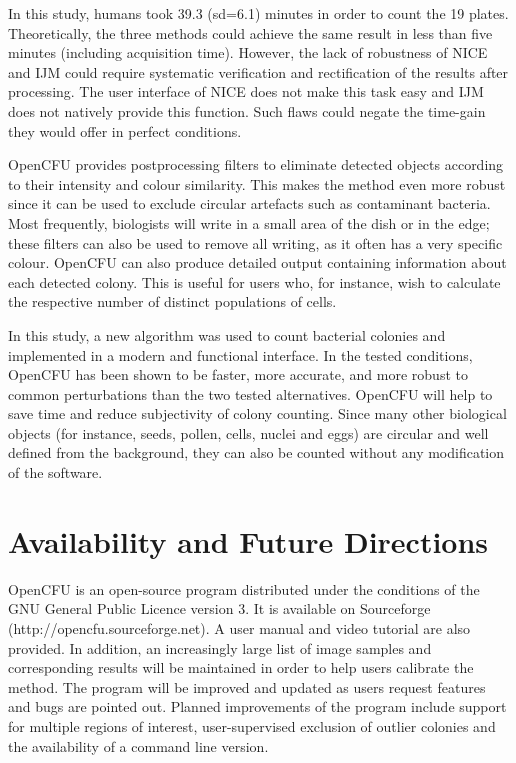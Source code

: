 \documentclass[10pt]{article}
\newcommand{\website}{http://opencfu.sourceforge.net}
\newcommand{\humantime}{39.3 (sd=6.1)}
\newcommand{\IJM}{IJM}
\begin{document}
In this study, humans took \humantime{} minutes in order to count the 19 plates.
Theoretically, the three methods could achieve the same result in less
than five minutes (including acquisition time). However, the lack of robustness of
NICE and \IJM{} could require systematic verification and
rectification of the results after processing. The user interface of NICE does not make this task easy and \IJM{} does not natively
provide this function. Such flaws could negate the time-gain they
would offer in perfect conditions.


OpenCFU provides postprocessing filters to eliminate detected
objects according to their intensity and colour similarity. This makes the method
even more robust since it can be used to exclude circular artefacts such as
contaminant bacteria. Most frequently, biologists will write in a small area of
the dish or in the edge; these filters can also be used to remove all writing, as it often has a very specific colour.
OpenCFU can also produce detailed output containing information about each detected
colony. This is useful for users who, for instance, wish to calculate the
respective number of distinct populations of cells.

In this study, a new algorithm was used to count bacterial colonies and
implemented in a modern and functional interface. In the tested conditions,
OpenCFU has been shown to be faster, more accurate, and
more robust to common perturbations than the two tested alternatives.
OpenCFU will help to save time and reduce subjectivity of colony
counting. Since many other biological objects (for instance, seeds, pollen, cells,
nuclei and eggs) are circular and well defined from the background, they 
can
also be counted without any modification of the software.

\section*{Availability and Future Directions}
OpenCFU is an open-source program distributed under the conditions of the GNU
General Public Licence version 3. It is available on Sourceforge (\website{}). A
user manual and video tutorial are also provided. In addition, an increasingly large list
of image samples and corresponding results will be maintained in order 
to 
help users calibrate the method. 
The program will be improved
and updated as users request features and bugs are pointed out.
Planned improvements of the program include support for multiple regions of interest,
user-supervised exclusion of outlier colonies and the availability of 
a command line version.
\end{document}
